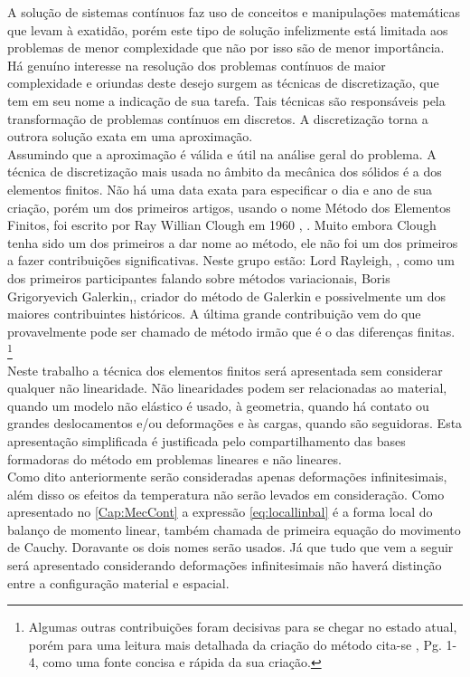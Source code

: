 A solução de sistemas contínuos faz uso de conceitos e manipulações matemáticas que levam à exatidão, porém este tipo de solução infelizmente está limitada aos problemas de menor complexidade que não por isso são de menor importância. Há genuíno interesse na resolução dos problemas contínuos de maior complexidade e oriundas deste desejo surgem as técnicas de discretização, que tem em seu nome a indicação de sua tarefa. Tais técnicas são responsáveis pela transformação de problemas contínuos em discretos. A discretização torna a outrora solução exata em uma aproximação. \\

Assumindo que a aproximação é válida e útil na análise geral do problema. A técnica de discretização mais usada no âmbito da mecânica dos sólidos é a dos elementos finitos. Não há uma data exata para especificar o dia e ano de sua criação, porém um dos primeiros artigos, usando o nome Método dos Elementos Finitos, foi escrito por Ray Willian Clough em 1960 , \cite{CloughFEA}. Muito embora Clough tenha sido um dos primeiros a dar nome ao método, ele não foi um dos primeiros a fazer contribuições significativas. Neste grupo estão: Lord Rayleigh, \cite{Rayleigh}, como um dos primeiros participantes falando sobre métodos variacionais, Boris Grigoryevich Galerkin,\cite{Galerkin}, criador do método de Galerkin e possivelmente um dos maiores contribuintes históricos. A última grande contribuição vem do que provavelmente pode ser chamado de método irmão que é o das diferenças finitas. \footnote{Algumas outras contribuições foram decisivas para se chegar no estado atual, porém  para uma leitura mais detalhada da criação do método cita-se ,\cite{zienkiewicz2013} Pg. 1-4, como uma fonte concisa e rápida da sua criação.} \\

Neste trabalho a técnica dos elementos finitos será apresentada sem considerar qualquer não linearidade. Não linearidades podem ser relacionadas ao material, quando um modelo não elástico é usado, à geometria, quando há contato ou grandes deslocamentos e/ou deformações e às cargas, quando são seguidoras. Esta apresentação simplificada é justificada pelo compartilhamento das bases formadoras do método em problemas lineares e não lineares.  \\

Como dito anteriormente serão consideradas apenas deformações infinitesimais, além disso os efeitos da temperatura não serão levados em consideração. Como apresentado no \ref{Cap:MecCont} a expressão \ref{eq:locallinbal} é a forma local do balanço de momento linear, também chamada de primeira equação do movimento de Cauchy. Doravante os dois nomes serão usados. Já que tudo que vem a seguir será apresentado considerando deformações infinitesimais não haverá distinção entre a configuração material e espacial. 

